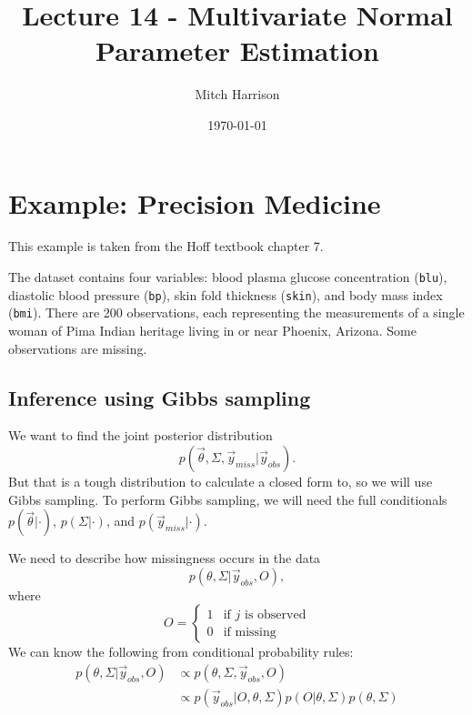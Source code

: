 \documentclass[titlepage, 12pt, leqno]{article}
\title{\Huge{Lecture 14 - Multivariate Normal Parameter Estimation}}
\author{\large{Mitch Harrison}}
\date{\today}
\begin{document}
\setlength{\parskip}{1\baselineskip}
\setlength{\parindent}{15pt}
\maketitle
\tableofcontents
\newpage


\section{Example: Precision Medicine}

\begin{note}
    This example is taken from the Hoff textbook chapter 7.
\end{note}

The dataset contains four variables: blood plasma glucose concentration
(\texttt{blu}), diastolic blood pressure (\texttt{bp}), skin fold thickness
(\texttt{skin}), and body mass index (\texttt{bmi}). There are 200 observations,
each representing the measurements of a single woman of Pima Indian heritage
living in or near Phoenix, Arizona. Some observations are missing.

\subsection{Inference using Gibbs sampling}
We want to find the joint posterior distribution
\[
p(\vec \theta, \Sigma, \vec y_{miss}|\vec y_{obs}).
\]
But that is a tough distribution to calculate a closed form to, so we will use
Gibbs sampling. To perform Gibbs sampling, we will need the full conditionals
$p(\vec \theta|\cdot)$, $p(\Sigma|\cdot)$, and $p(\vec y_{miss}|\cdot)$.

We need to describe how missingness occurs in the data
\[
p(\theta, \Sigma | \vec y_{obs}, O),
\]
where
\[
O = 
\begin{cases}
    1 & \text{if $j$ is observed} \\
    0 & \text{if missing}
\end{cases}
\]
We can know the following from conditional probability rules:
\begin{align*}
    p(\theta, \Sigma|\vec y_{obs}, O) &\propto p(\theta, \Sigma, 
    \vec y_{obs}, O)\\
                                      &\propto p(\vec y_{obs}|O, \theta,
                                       \Sigma)p(O|\theta, \Sigma)p(\theta,
                                       \Sigma)
\end{align*}
\end{document}

